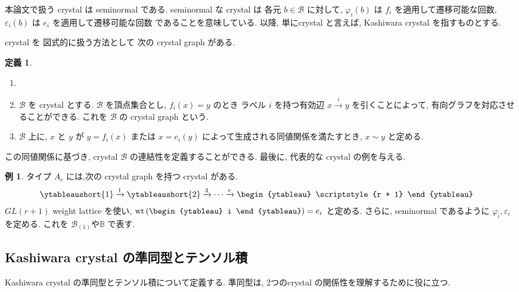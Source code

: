 \documentclass[
  a4paper, 
  12pt,
  ja=standard,
  xelatex,
  left=30truemm,
  right=30truemm,
  titlepage 
]{bxjsarticle}
\theoremstyle{definition}
\newtheorem{df}{定義}[section]
\newtheorem*{ex}{例}
\begin{document}
本論文で扱う crystal は seminormal である.
seminormal な crystal は 各元 $b \in \mathcal{B}$ に対して,
$\varphi_i(b)$ は $f_i$ を適用して遷移可能な回数,
$\varepsilon_i(b)$ は $e_i$ を適用して遷移可能な回数 であることを意味している.
以降, 単にcrystal と言えば, Kashiwara crystal を指すものとする.

crystal を 図式的に扱う方法として 次の crystal graph がある.

\begin{df}
  \begin{enumerate}
    \item []
    \item $\mathcal{B}$ を crystal とする.  $\mathcal{B}$ を頂点集合とし,  $f_i(x) = y$ のとき
    ラベル $i$ を持つ有効辺 $ x \xrightarrow{i} y$ を引くことによって, 有向グラフを対応させることができる.
    これを $\mathcal{B}$ の crystal graph という.
    \item $\mathcal{B}$ 上に, $x$ と $y$ が $y = f_i(x)$ または $x = e_i(y)$ によって生成される同値関係を満たすとき,
    $x \sim y$ と定める.
  \end{enumerate}
\end{df}

この同値関係に基づき, crystal $\mathcal{B}$ の連結性を定義することができる.
最後に, 代表的な crystal の例を与える.

\begin{ex}
  タイプ $A_r$ には,次の crystal graph を持つ crystal がある.
  \[
  \begin{aligned}
      \ytableaushort{1}
      &\xrightarrow{1}
      \ytableaushort{2}
      \xrightarrow{2}
      \cdots
      \xrightarrow{r}
      \begin{ytableau}
        \scriptstyle{r + 1}
      \end{ytableau}
  \end{aligned}
  \]
  $GL(r + 1)$ weight lattice を使い, $\mathrm{wt} \left( \begin{ytableau} i \end{ytableau} \right) = e_i$ と定める.
  さらに, seminormal であるように $\varphi_i, \varepsilon_i$ を定める. これを $\mathcal{B}_{(1)}$や$\mathbb{B}$ で表す.
\end{ex}

\subsection{Kashiwara crystal の準同型とテンソル積}
Kashiwara crystal の準同型とテンソル積について定義する. 
準同型は, 2つのcrystal の関係性を理解するために役に立つ.
\end{document}
